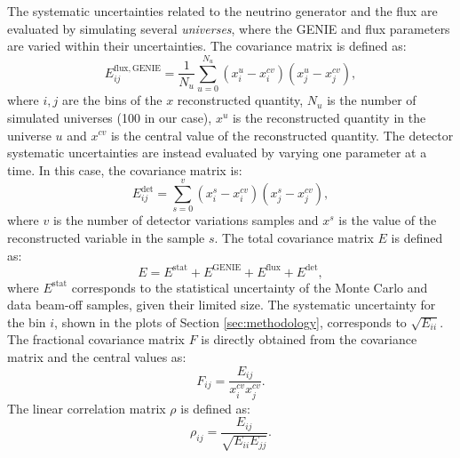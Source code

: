 The systematic uncertainties related to the neutrino generator and the flux are evaluated by simulating several \emph{universes}, where the GENIE and flux parameters are varied within their uncertainties. The covariance matrix is defined as:
\begin{equation}
    E_{ij}^{\mathrm{flux, GENIE}} = \frac{1}{N_{u}} \sum^{N_{u}}_{u=0} (x^{u}_{i} - x^{cv}_{i}) (x^{u}_{j} - x^{cv}_{j}),\label{eq:covariance}
\end{equation}
where $i,j$ are the bins of the $x$ reconstructed quantity, $N_{u}$ is the number of simulated universes (100 in our case), $x^{u}$ is the reconstructed quantity in the universe $u$ and $x^{cv}$ is the central value of the reconstructed quantity. 
The detector systematic uncertainties are instead evaluated by varying one parameter at a time. In this case, the covariance matrix is:
\begin{equation}
    E_{ij}^{\mathrm{det}} = \sum^{v}_{s=0} (x^{s}_{i} - x^{cv}_{i}) (x^{s}_{j} - x^{cv}_{j}),\label{eq:cov_det}
\end{equation}
where $v$ is the number of detector variations samples and $x^{s}$ is the value of the reconstructed variable in the sample $s$. The total covariance matrix $E$ is defined as:
\begin{equation}
    E = E^{\mathrm{stat}} + E^{\mathrm{GENIE}} + E^{\mathrm{flux}} + E^{\mathrm{det}},\label{eq:cov_tot}
\end{equation}
where $E^{\mathrm{stat}}$ corresponds to the statistical uncertainty of the Monte Carlo and data beam-off samples, given their limited size. 
The systematic uncertainty for the bin $i$, shown in the plots of Section \ref{sec:methodology}, corresponds to $\sqrt{E_{ii}}$. The fractional covariance matrix $F$ is directly obtained from the covariance matrix and the central values as:
\begin{equation} 
    F_{ij} = \frac{E_{ij}}{x_{i}^{cv} x_{j}^{cv}}.
\end{equation}
The linear correlation matrix $\rho$ is defined as:
\begin{equation}
    \rho_{ij} = \frac{E_{ij}}{\sqrt{E_{ii}E_{jj}}}.
\end{equation}

